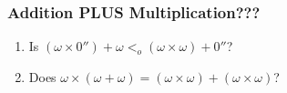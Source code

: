 \begin{frame}
\frametitle{Addition PLUS Multiplication???}

\begin{enumerate}[<+->]

\item Is \((\omega \times 0'') + \omega <_o (\omega \times \omega) + 0''\)?

\item Does \(\omega \times (\omega + \omega) = (\omega \times \omega) + (\omega \times \omega)\)?





\end{enumerate}
\end{frame}







\iffalse %

